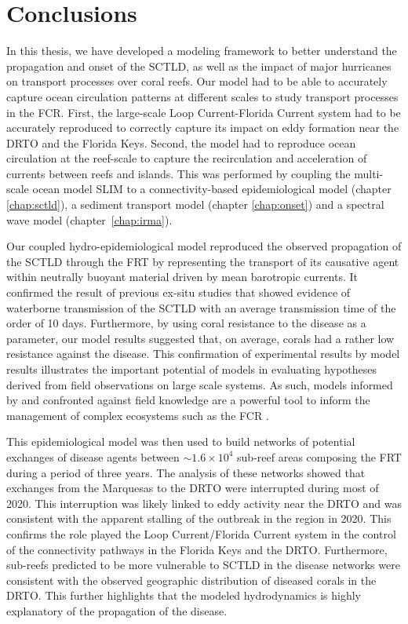 \section{Conclusions}
In this thesis, we have developed a modeling framework to better understand the propagation and onset of the SCTLD, as well as the impact of major hurricanes on transport processes over coral reefs. Our model had to be able to accurately capture ocean circulation patterns at different scales to study transport processes in the FCR. First, the large-scale Loop Current-Florida Current system had to be accurately reproduced to correctly capture its impact on eddy formation near the DRTO and the Florida Keys. Second, the model had to reproduce ocean circulation at the reef-scale to capture the recirculation and acceleration of currents between reefs and islands. This was performed by coupling the multi-scale ocean model SLIM to a connectivity-based epidemiological model (chapter \ref{chap:sctld}), a sediment transport model (chapter \ref{chap:onset}) and a spectral wave model (chapter~\ref{chap:irma}).

Our coupled hydro-epidemiological model reproduced the observed propagation of the SCTLD through the FRT by representing the transport of its causative agent within neutrally buoyant material driven by mean barotropic currents. It confirmed the result of previous ex-situ studies that showed evidence of waterborne transmission of the SCTLD with an average transmission time of the order of 10 days. Furthermore, by using coral resistance to the disease as a parameter, our model results suggested that, on average, corals had a rather low resistance against the disease. This confirmation of experimental results by model results illustrates the important potential of models in evaluating hypotheses derived from field observations on large scale systems. As such, models informed by and confronted against field knowledge are a powerful tool to inform the management of complex ecosystems such as the FCR \citep{foster2012connectivity}.

This epidemiological model was then used to build networks of potential exchanges of disease agents between $\sim 1.6\times10^4$ sub-reef areas composing the FRT during a period of three years. The analysis of these networks showed that exchanges from the Marquesas to the DRTO were interrupted during most of 2020. This interruption was likely linked to eddy activity near the DRTO and was consistent with the apparent stalling of the outbreak in the region in 2020. This confirms the role played the Loop Current/Florida Current system in the control of the connectivity pathways in the Florida Keys and the DRTO. Furthermore, sub-reefs predicted to be more vulnerable to SCTLD in the disease networks were consistent with the observed geographic distribution of diseased corals in the DRTO. This further highlights that the modeled hydrodynamics is highly explanatory of the propagation of the disease.

